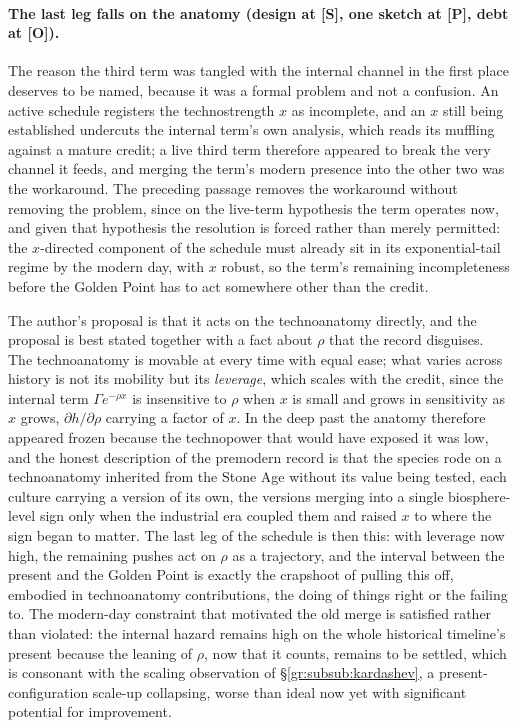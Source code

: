 \paragraph{The last leg falls on the anatomy (design at \textbf{[S]},
one sketch at \textbf{[P]}, debt at \textbf{[O]}).}\label{sch:rem:anatomyleg}
The reason the third term was tangled with the internal channel in
the first place deserves to be named, because it was a formal
problem and not a confusion. An active schedule registers the
technostrength $x$ as incomplete, and an $x$ still being established
undercuts the internal term's own analysis, which reads its muffling
against a mature credit; a live third term therefore appeared to
break the very channel it feeds, and merging the term's modern
presence into the other two was the workaround. The preceding
passage removes the workaround without removing the problem, since
on the live-term hypothesis the term operates now, and given that
hypothesis the resolution is forced rather than merely permitted:
the $x$-directed component of the schedule must already sit in its
exponential-tail regime by the modern day, with $x$ robust, so the
term's remaining incompleteness before the Golden Point has to act
somewhere other than the credit.

The author's proposal is that it acts on the technoanatomy
directly, and the proposal is best stated together with a fact
about $\rho$ that the record disguises. The technoanatomy is
movable at every time with equal ease; what varies across history is
not its mobility but its \emph{leverage}, which scales with the
credit, since the internal term $\Gamma e^{-\rho x}$ is insensitive
to $\rho$ when $x$ is small and grows in sensitivity as $x$ grows,
$\partial h/\partial\rho$ carrying a factor of $x$. In the deep past
the anatomy therefore appeared frozen because the technopower that
would have exposed it was low, and the honest description of the
premodern record is that the species rode on a technoanatomy
inherited from the Stone Age without its value being tested, each
culture carrying a version of its own, the versions merging into a
single biosphere-level sign only when the industrial era coupled
them and raised $x$ to where the sign began to matter. The last leg
of the schedule is then this: with leverage now high, the remaining
pushes act on $\rho$ as a trajectory, and the interval between the
present and the Golden Point is exactly the crapshoot of pulling
this off, embodied in technoanatomy contributions, the doing of
things right or the failing to. The modern-day constraint that
motivated the old merge is satisfied rather than violated: the
internal hazard remains high on the whole historical timeline's
present because the leaning of $\rho$, now that it counts, remains
to be settled, which is consonant with the scaling observation of
\S\ref{gr:subsub:kardashev}, a present-configuration scale-up
collapsing, worse than ideal now yet with significant potential for
improvement.

